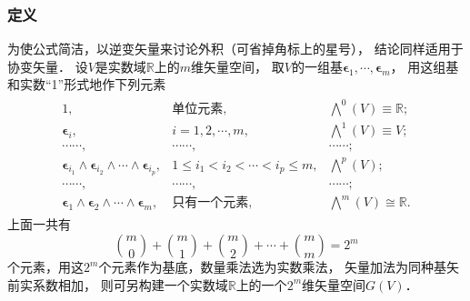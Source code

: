 \subsubsection{定义}\label{chmla:sec_def-exterior-product}
为使公式简洁，以逆变矢量来讨论外积（可省掉角标上的星号），
结论同样适用于协变矢量．
设$V$是实数域$\mathbb{R}$上的$m$维矢量空间，
取$V$的一组基$\boldsymbol{\epsilon}_1,\cdots,\boldsymbol{\epsilon}_m$，
用这组基和实数“1”形式地作下列元素
\begin{equation}\label{chmla:eqn_grassman-bases}
\begin{aligned}
\begin{array}{lll}
    1, & \text{单位元素}, &\bigwedge^0(V)\equiv \mathbb{R}; \\
    \boldsymbol{\epsilon}_i, & i=1,2,\cdots,m , &\bigwedge^1(V) \equiv V; \\
    \cdots\cdots, & \cdots\cdots , & \cdots\cdots; \\
    \boldsymbol{\epsilon}_{i_1} \wedge \boldsymbol{\epsilon}_{i_2} \wedge \cdots \wedge \boldsymbol{\epsilon}_{i_p},
      & 1\leqslant {i_1} < {i_2} < \cdots <i_p  \leqslant m , &\bigwedge^p(V); \\
    \cdots\cdots, & \cdots\cdots , & \cdots\cdots; \\
    \boldsymbol{\epsilon}_{1} \wedge \boldsymbol{\epsilon}_{2} \wedge \cdots \wedge \boldsymbol{\epsilon}_{m},
      & \text{只有一个元素}, &\bigwedge^m(V) \cong \mathbb{R}.
\end{array}
\end{aligned}
\end{equation}
上面一共有
\begin{equation}
    \binom{m}{0} + \binom{m}{1} +\binom{m}{2} + \cdots + \binom{m}{m} = 2^m  
\end{equation}
个元素，用这$2^m$个元素作为基底，数量乘法选为实数乘法，
矢量加法为同种基矢前实系数相加，
则可另构建一个实数域$\mathbb{R}$上的一个$2^m$维矢量空间$G(V)$．

